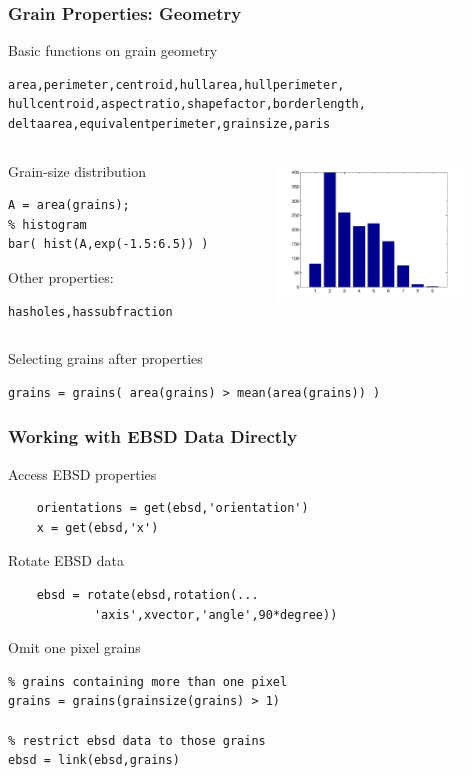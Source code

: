 %
\begin{frame}[fragile]
  \frametitle{Grain Properties: Geometry}

Basic functions on grain geometry
\begin{lstlisting}[basicstyle=\footnotesize]
area,perimeter,centroid,hullarea,hullperimeter,
hullcentroid,aspectratio,shapefactor,borderlength,
deltaarea,equivalentperimeter,grainsize,paris
\end{lstlisting}
%

\begin{columns}[t]
  \begin{column}[T]{6.5cm}
  Grain-size distribution
\begin{lstlisting}
A = area(grains);
% histogram
bar( hist(A,exp(-1.5:6.5)) )
\end{lstlisting}

Other properties:
\begin{lstlisting}[basicstyle=\footnotesize]
hasholes,hassubfraction
\end{lstlisting}

	\end{column}
	\begin{column}[T]{5cm}
		\includegraphics[width=5cm]{pic/grh}
	\end{column}
\end{columns}

Selecting grains after properties
\begin{lstlisting}
grains = grains( area(grains) > mean(area(grains)) )
\end{lstlisting}

\end{frame}


%
\begin{frame}[fragile]
  \frametitle{Working with EBSD Data Directly}

	Access EBSD properties
\begin{lstlisting}
	orientations = get(ebsd,'orientation')
	x = get(ebsd,'x')
\end{lstlisting}

	\medskip

	Rotate EBSD data
\begin{lstlisting}
	ebsd = rotate(ebsd,rotation(...
			'axis',xvector,'angle',90*degree))
\end{lstlisting}

	\medskip
        Omit one pixel grains
\begin{lstlisting}
% grains containing more than one pixel
grains = grains(grainsize(grains) > 1)

% restrict ebsd data to those grains
ebsd = link(ebsd,grains)
\end{lstlisting}

\end{frame}

